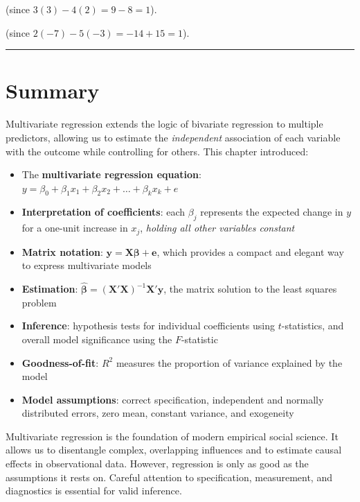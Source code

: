 \documentclass[
  letterpaper,
  DIV=11,
  numbers=noendperiod]{scrreprt}
\providecommand{\tightlist}{%
  \setlength{\itemsep}{0pt}\setlength{\parskip}{0pt}}
\begin{document}
(since \(3(3) - 4(2) = 9 - 8 = 1\)).

(since \(2(-7) - 5(-3) = -14 + 15 = 1\)).

\begin{center}\rule{0.5\linewidth}{0.5pt}\end{center}

\section{Summary}\label{summary-3}

Multivariate regression extends the logic of bivariate regression to
multiple predictors, allowing us to estimate the \emph{independent}
association of each variable with the outcome while controlling for
others. This chapter introduced:

\begin{itemize}
\tightlist
\item
  The \textbf{multivariate regression equation}:
  \(y = \beta_0 + \beta_1 x_1 + \beta_2 x_2 + \ldots + \beta_k x_k + e\)
\item
  \textbf{Interpretation of coefficients}: each \(\beta_j\) represents
  the expected change in \(y\) for a one-unit increase in \(x_j\),
  \emph{holding all other variables constant}
\item
  \textbf{Matrix notation}:
  \(\mathbf{y} = \mathbf{X} \boldsymbol{\beta} + \mathbf{e}\), which
  provides a compact and elegant way to express multivariate models
\item
  \textbf{Estimation}:
  \(\hat{\boldsymbol{\beta}} = (\mathbf{X}'\mathbf{X})^{-1} \mathbf{X}' \mathbf{y}\),
  the matrix solution to the least squares problem
\item
  \textbf{Inference}: hypothesis tests for individual coefficients using
  \(t\)-statistics, and overall model significance using the
  \(F\)-statistic
\item
  \textbf{Goodness-of-fit}: \(R^2\) measures the proportion of variance
  explained by the model
\item
  \textbf{Model assumptions}: correct specification, independent and
  normally distributed errors, zero mean, constant variance, and
  exogeneity
\end{itemize}

Multivariate regression is the foundation of modern empirical social
science. It allows us to disentangle complex, overlapping influences and
to estimate causal effects in observational data. However, regression is
only as good as the assumptions it rests on. Careful attention to
specification, measurement, and diagnostics is essential for valid
inference.
\end{document}

